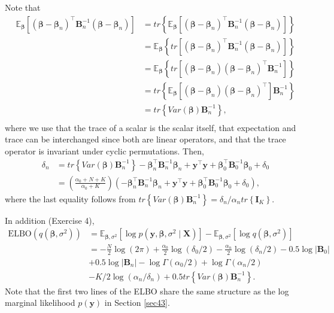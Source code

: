 Note that
\begin{align*}
	\mathbb{E}_{\boldsymbol{\beta}}\left[(\boldsymbol{\beta}-\boldsymbol{\beta}_n)^{\top}\boldsymbol{B}_n^{-1}(\boldsymbol{\beta}-\boldsymbol{\beta}_n)\right]&=tr\left\{\mathbb{E}_{\boldsymbol{\beta}}\left[(\boldsymbol{\beta}-\boldsymbol{\beta}_n)^{\top}\boldsymbol{B}_n^{-1}(\boldsymbol{\beta}-\boldsymbol{\beta}_n)\right]\right\}\\
	&=\mathbb{E}_{\boldsymbol{\beta}}\left\{tr\left[(\boldsymbol{\beta}-\boldsymbol{\beta}_n)^{\top}\boldsymbol{B}_n^{-1}(\boldsymbol{\beta}-\boldsymbol{\beta}_n)\right]\right\}\\
	&=\mathbb{E}_{\boldsymbol{\beta}}\left\{tr\left[(\boldsymbol{\beta}-\boldsymbol{\beta}_n)(\boldsymbol{\beta}-\boldsymbol{\beta}_n)^{\top}\boldsymbol{B}_n^{-1}\right]\right\}\\
	&=tr\left\{\mathbb{E}_{\boldsymbol{\beta}}\left[(\boldsymbol{\beta}-\boldsymbol{\beta}_n)(\boldsymbol{\beta}-\boldsymbol{\beta}_n)^{\top}\right]\boldsymbol{B}_n^{-1}\right\}\\
	&=tr\left\{Var(\boldsymbol{\beta})\boldsymbol{B}_n^{-1}\right\},\\
\end{align*}
where we use that the trace of a scalar is the scalar itself, that expectation and trace can be interchanged since both are linear operators, and that the trace operator is invariant under cyclic permutations.
Then, \begin{align*}
	\delta_n&=tr\left\{Var(\boldsymbol{\beta})\boldsymbol{B}_n^{-1}\right\}-\boldsymbol{\beta}_n^{\top}\boldsymbol{B}_n^{-1}\boldsymbol{\beta}_n+\boldsymbol{y}^{\top}\boldsymbol{y}+\boldsymbol{\beta}_0^{\top}\boldsymbol{B}_0^{-1}\boldsymbol{\beta}_0+\delta_0\\
	&=\left(\frac{\alpha_0+N+K}{\alpha_0+K}\right)\left(-\boldsymbol{\beta}_n^{\top}\boldsymbol{B}_n^{-1}\boldsymbol{\beta}_n+\boldsymbol{y}^{\top}\boldsymbol{y}+\boldsymbol{\beta}_0^{\top}\boldsymbol{B}_0^{-1}\boldsymbol{\beta}_0+\delta_0\right),
\end{align*}
where the last equality follows from $tr\left\{Var(\boldsymbol{\beta})\boldsymbol{B}_n^{-1}\right\}=\delta_n/\alpha_n tr\left\{\boldsymbol{I}_K\right\}$.
 
In addition (Exercise 4),
\begin{align*}
	\text{ELBO}(q(\boldsymbol{\beta},\sigma^2))&=\mathbb{E}_{\boldsymbol{\beta},\sigma^2}[\log p(\boldsymbol{y},\boldsymbol{\beta},\sigma^2\mid\boldsymbol{X})]-\mathbb{E}_{\boldsymbol{\beta},\sigma^2}[\log q(\boldsymbol{\beta},\sigma^2)]\\
	&=-\frac{N}{2}\log(2\pi)+\frac{\alpha_0}{2}\log(\delta_0/2)-\frac{\alpha_n}{2}\log(\delta_n/2)-0.5\log|\boldsymbol{B}_0|\\
	&+0.5\log|\boldsymbol{B}_n|-\log\Gamma(\alpha_0/2)+\log\Gamma(\alpha_n/2)\\
	&-K/2\log(\alpha_n/\delta_n)+0.5tr\left\{Var(\boldsymbol{\beta})\boldsymbol{B}_n^{-1}\right\}.
\end{align*}
Note that the first two lines of the ELBO share the same structure as the log marginal likelihood $p(\boldsymbol{y})$ in Section \ref{sec43}.

